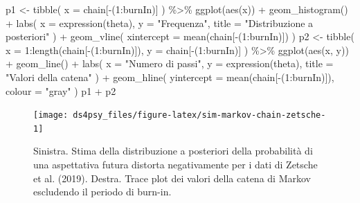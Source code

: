 \documentclass[
  11pt,
]{krantz}
\makeatletter
\newenvironment{Shaded}{\begin{snugshade}}{\end{snugshade}}
\newcommand{\AttributeTok}[1]{\textcolor[rgb]{0.61,0.61,0.61}{#1}}
\newcommand{\DecValTok}[1]{\textcolor[rgb]{0.06,0.06,0.06}{#1}}
\newcommand{\FunctionTok}[1]{\textcolor[rgb]{0,0,0}{#1}}
\newcommand{\NormalTok}[1]{#1}
\newcommand{\OtherTok}[1]{\textcolor[rgb]{0.37,0.37,0.37}{#1}}
\newcommand{\SpecialCharTok}[1]{\textcolor[rgb]{0,0,0}{#1}}
\newcommand{\StringTok}[1]{\textcolor[rgb]{0.5,0.5,0.5}{#1}}
\newenvironment{kframe}{%
\medskip{}
\setlength{\fboxsep}{.8em}
 \def\at@end@of@kframe{}%
 \ifinner\ifhmode%
  \def\at@end@of@kframe{\end{minipage}}%
  \begin{minipage}{\columnwidth}%
 \fi\fi%
 \def\FrameCommand##1{\hskip\@totalleftmargin \hskip-\fboxsep
 \colorbox{shadecolor}{##1}\hskip-\fboxsep
     \hskip-\linewidth \hskip-\@totalleftmargin \hskip\columnwidth}%
 \MakeFramed {\advance\hsize-\width
   \@totalleftmargin\z@ \linewidth\hsize
   \@setminipage}}%
 {\par\unskip\endMakeFramed%
 \at@end@of@kframe}
\renewenvironment{Shaded}{\begin{kframe}}{\end{kframe}}
\theoremstyle{definition}
\theoremstyle{definition}
\theoremstyle{definition}
\theoremstyle{definition}
\theoremstyle{remark}
\makeatother
\begin{document}
\begin{Shaded}
\begin{Highlighting}[]
\NormalTok{p1 }\OtherTok{\textless{}{-}} \FunctionTok{tibble}\NormalTok{(}
  \AttributeTok{x =}\NormalTok{ chain[}\SpecialCharTok{{-}}\NormalTok{(}\DecValTok{1}\SpecialCharTok{:}\NormalTok{burnIn)]}
\NormalTok{) }\SpecialCharTok{\%\textgreater{}\%}
  \FunctionTok{ggplot}\NormalTok{(}\FunctionTok{aes}\NormalTok{(x)) }\SpecialCharTok{+}
  \FunctionTok{geom\_histogram}\NormalTok{() }\SpecialCharTok{+}
  \FunctionTok{labs}\NormalTok{(}
    \AttributeTok{x =} \FunctionTok{expression}\NormalTok{(theta),}
    \AttributeTok{y =} \StringTok{"Frequenza"}\NormalTok{,}
    \AttributeTok{title =} \StringTok{"Distribuzione a posteriori"}
\NormalTok{  ) }\SpecialCharTok{+}
  \FunctionTok{geom\_vline}\NormalTok{(}
    \AttributeTok{xintercept =} \FunctionTok{mean}\NormalTok{(chain[}\SpecialCharTok{{-}}\NormalTok{(}\DecValTok{1}\SpecialCharTok{:}\NormalTok{burnIn)])}
\NormalTok{  )}
\NormalTok{p2 }\OtherTok{\textless{}{-}} \FunctionTok{tibble}\NormalTok{(}
  \AttributeTok{x =} \DecValTok{1}\SpecialCharTok{:}\FunctionTok{length}\NormalTok{(chain[}\SpecialCharTok{{-}}\NormalTok{(}\DecValTok{1}\SpecialCharTok{:}\NormalTok{burnIn)]),}
  \AttributeTok{y =}\NormalTok{ chain[}\SpecialCharTok{{-}}\NormalTok{(}\DecValTok{1}\SpecialCharTok{:}\NormalTok{burnIn)]}
\NormalTok{) }\SpecialCharTok{\%\textgreater{}\%}
  \FunctionTok{ggplot}\NormalTok{(}\FunctionTok{aes}\NormalTok{(x, y)) }\SpecialCharTok{+}
  \FunctionTok{geom\_line}\NormalTok{() }\SpecialCharTok{+}
  \FunctionTok{labs}\NormalTok{(}
    \AttributeTok{x =} \StringTok{"Numero di passi"}\NormalTok{,}
    \AttributeTok{y =} \FunctionTok{expression}\NormalTok{(theta),}
    \AttributeTok{title =} \StringTok{"Valori della catena"}
\NormalTok{  ) }\SpecialCharTok{+}
  \FunctionTok{geom\_hline}\NormalTok{(}
    \AttributeTok{yintercept =} \FunctionTok{mean}\NormalTok{(chain[}\SpecialCharTok{{-}}\NormalTok{(}\DecValTok{1}\SpecialCharTok{:}\NormalTok{burnIn)]),}
    \AttributeTok{colour =} \StringTok{"gray"}
\NormalTok{  )}
\NormalTok{p1 }\SpecialCharTok{+}\NormalTok{ p2}
\end{Highlighting}
\end{Shaded}

\begin{figure}[h]

{\centering \texttt{[image: ds4psy\_files/figure-latex/sim-markov-chain-zetsche-1]} 

}

\caption{Sinistra. Stima della distribuzione a posteriori della probabilità di una aspettativa futura distorta negativamente per i dati di Zetsche et al. (2019). Destra. Trace plot dei valori della catena di Markov escludendo il periodo di burn-in.}\label{fig:sim-markov-chain-zetsche}
\end{figure}
\end{document}

